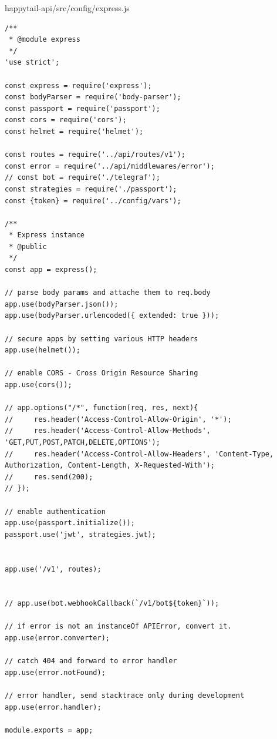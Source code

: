 \documentclass[12pt]{article}
\begin{document}
  \normalsize
 happytail-api/src/config/express.js
 \footnotesize
\begin{verbatim}
/**
 * @module express
 */
'use strict';

const express = require('express');
const bodyParser = require('body-parser');
const passport = require('passport');
const cors = require('cors');
const helmet = require('helmet');

const routes = require('../api/routes/v1');
const error = require('../api/middlewares/error');
// const bot = require('./telegraf');
const strategies = require('./passport');
const {token} = require('../config/vars');

/**
 * Express instance
 * @public
 */
const app = express();

// parse body params and attache them to req.body
app.use(bodyParser.json());
app.use(bodyParser.urlencoded({ extended: true }));

// secure apps by setting various HTTP headers
app.use(helmet());

// enable CORS - Cross Origin Resource Sharing
app.use(cors());

// app.options("/*", function(req, res, next){
//     res.header('Access-Control-Allow-Origin', '*');
//     res.header('Access-Control-Allow-Methods', 'GET,PUT,POST,PATCH,DELETE,OPTIONS');
//     res.header('Access-Control-Allow-Headers', 'Content-Type, Authorization, Content-Length, X-Requested-With');
//     res.send(200);
// });

// enable authentication
app.use(passport.initialize());
passport.use('jwt', strategies.jwt);


app.use('/v1', routes);


// app.use(bot.webhookCallback(`/v1/bot${token}`));

// if error is not an instanceOf APIError, convert it.
app.use(error.converter);

// catch 404 and forward to error handler
app.use(error.notFound);

// error handler, send stacktrace only during development
app.use(error.handler);

module.exports = app;

 \end{verbatim}
\end{document}
